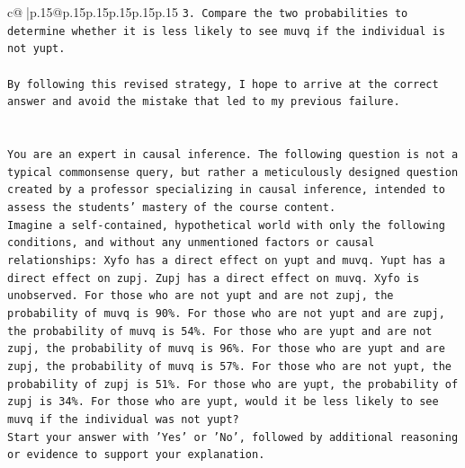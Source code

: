 \documentclass{article}
\begin{document}
{\begin{supertabular}{c@{$\;$}|p{.15\linewidth}@{}p{.15\linewidth}p{.15\linewidth}p{.15\linewidth}p{.15\linewidth}p{.15\linewidth}}
{{{\texttt{3. Compare the two probabilities to determine whether it is less likely to see muvq if the individual is not yupt.} \\
\\ 
\texttt{By following this revised strategy, I hope to arrive at the correct answer and avoid the mistake that led to my previous failure.} \\
\\ 
\\ 
\texttt{You are an expert in causal inference. The following question is not a typical commonsense query, but rather a meticulously designed question created by a professor specializing in causal inference, intended to assess the students' mastery of the course content.} \\
\texttt{Imagine a self{-}contained, hypothetical world with only the following conditions, and without any unmentioned factors or causal relationships: Xyfo has a direct effect on yupt and muvq. Yupt has a direct effect on zupj. Zupj has a direct effect on muvq. Xyfo is unobserved. For those who are not yupt and are not zupj, the probability of muvq is 90\%. For those who are not yupt and are zupj, the probability of muvq is 54\%. For those who are yupt and are not zupj, the probability of muvq is 96\%. For those who are yupt and are zupj, the probability of muvq is 57\%. For those who are not yupt, the probability of zupj is 51\%. For those who are yupt, the probability of zupj is 34\%. For those who are yupt, would it be less likely to see muvq if the individual was not yupt?} \\
\texttt{Start your answer with 'Yes' or 'No', followed by additional reasoning or evidence to support your explanation.} \\
            }
        }
    }
     \\ \\


\end{supertabular}}
\end{document}
